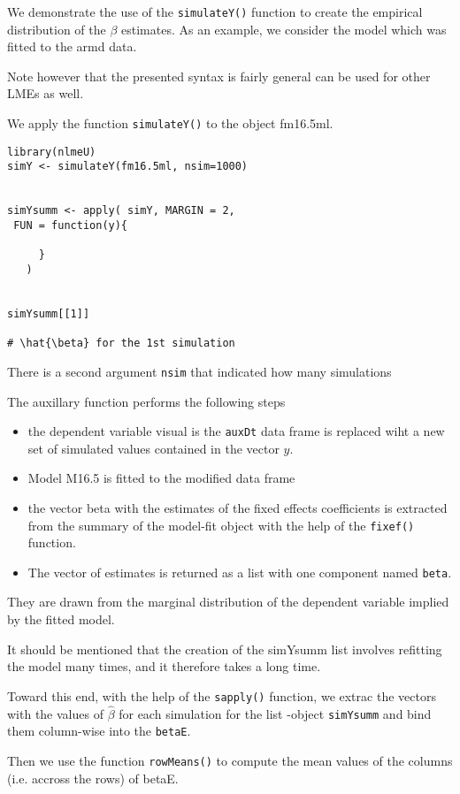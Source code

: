 \documentclass[a4paper,12pt]{article}
\begin{document}
We demonstrate the use of the \texttt{simulateY()} function to create the empirical distribution of the \textbf{$\beta$} estimates.
As an example, we consider the model which was fitted to the armd data.

Note however that the presented syntax is fairly general can be used for other LMEs as well.

We apply the function \texttt{simulateY()} to the object fm16.5ml.



\begin{framed}
\begin{verbatim}
library(nlmeU)
simY <- simulateY(fm16.5ml, nsim=1000)


simYsumm <- apply( simY, MARGIN = 2, 
 FUN = function(y){

     }
   )


simYsumm[[1]]

# \hat{\beta} for the 1st simulation
\end{verbatim}
\end{framed}

There is a second argument \texttt{nsim} that indicated how many simulations 

The auxillary function performs the following steps

\begin{itemize}
\item the dependent variable visual is the \texttt{auxDt} data frame is replaced wiht a new set of simulated values contained in the vector $y$.
\item Model M16.5 is fitted to the modified data frame
\item the vector beta with the estimates of the fixed effects coefficients is extracted from the summary of the model-fit object with the help of the \texttt{fixef()} function.
\item The vector of estimates is returned as a list with one component named \texttt{beta}.
\end{itemize}

They are drawn from the marginal distribution of the dependent variable implied by the fitted model.



It should be mentioned that the creation of the simYsumm list involves refitting the model many times, and it therefore takes a long time.

Toward this end, with the help of the \texttt{sapply()} function, we extrac the vectors with the values of $\hat{\beta}$ for each simulation for the list
-object \texttt{simYsumm} and bind them column-wise into the \texttt{betaE}.

Then we use the function \texttt{rowMeans()} to compute the mean values of the columns (i.e. accross the rows) of betaE.



\end{document}
